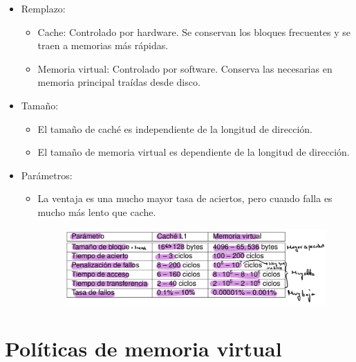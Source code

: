 \documentclass[12pt, twoside, openright]{report} %
\begin{document}
    \begin{itemize}
    
    \item
      Remplazo:

      \begin{itemize}
      
      \item
        Cache: Controlado por hardware. Se conservan los bloques
        frecuentes y se traen a memorias más rápidas.
      \item
        Memoria virtual: Controlado por software. Conserva las
        necesarias en memoria principal traídas desde disco.
      \end{itemize}
    \item
      Tamaño:

      \begin{itemize}
      
      \item
        El tamaño de caché es independiente de la longitud de dirección.
      \item
        El tamaño de memoria virtual es dependiente de la longitud de
        dirección.
      \end{itemize}
      \pagebreak
    \item
      Parámetros:

      \begin{itemize}
      \item
        La ventaja es una mucho mayor tasa de aciertos, pero cuando
        falla es mucho más lento que cache.
        \begin{figure}[H]
          {\includegraphics[scale=.4]{Untitled 28.png}}
        \end{figure}
      \end{itemize}
    \end{itemize}

 \section{Políticas de memoria virtual}
\end{document}
